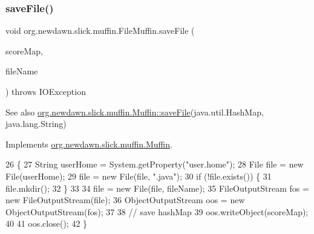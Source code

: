 \subsubsection{\texorpdfstring{save\+File()}{saveFile()}}
{\footnotesize\ttfamily void org.\+newdawn.\+slick.\+muffin.\+File\+Muffin.\+save\+File (\begin{DoxyParamCaption}\item[{Hash\+Map}]{score\+Map,  }\item[{String}]{file\+Name }\end{DoxyParamCaption}) throws I\+O\+Exception\hspace{0.3cm}{\ttfamily [inline]}}

\begin{DoxySeeAlso}{See also}
\mbox{\hyperlink{interfaceorg_1_1newdawn_1_1slick_1_1muffin_1_1_muffin_a025189130fb123bc751e58677435974a}{org.\+newdawn.\+slick.\+muffin.\+Muffin\+::save\+File}}(java.\+util.\+Hash\+Map, java.\+lang.\+String) 
\end{DoxySeeAlso}


Implements \mbox{\hyperlink{interfaceorg_1_1newdawn_1_1slick_1_1muffin_1_1_muffin_a025189130fb123bc751e58677435974a}{org.\+newdawn.\+slick.\+muffin.\+Muffin}}.


\begin{DoxyCode}
26                                                                                \{
27         String userHome = System.getProperty(\textcolor{stringliteral}{"user.home"});
28         File file = \textcolor{keyword}{new} File(userHome);
29         file = \textcolor{keyword}{new} File(file, \textcolor{stringliteral}{".java"});
30         \textcolor{keywordflow}{if} (!file.exists()) \{
31             file.mkdir();
32         \}
33 
34         file = \textcolor{keyword}{new} File(file, fileName);
35         FileOutputStream fos = \textcolor{keyword}{new} FileOutputStream(file);
36         ObjectOutputStream oos = \textcolor{keyword}{new} ObjectOutputStream(fos);
37 
38         \textcolor{comment}{// save hashMap}
39         oos.writeObject(scoreMap);
40 
41         oos.close();
42     \}
\end{DoxyCode}
